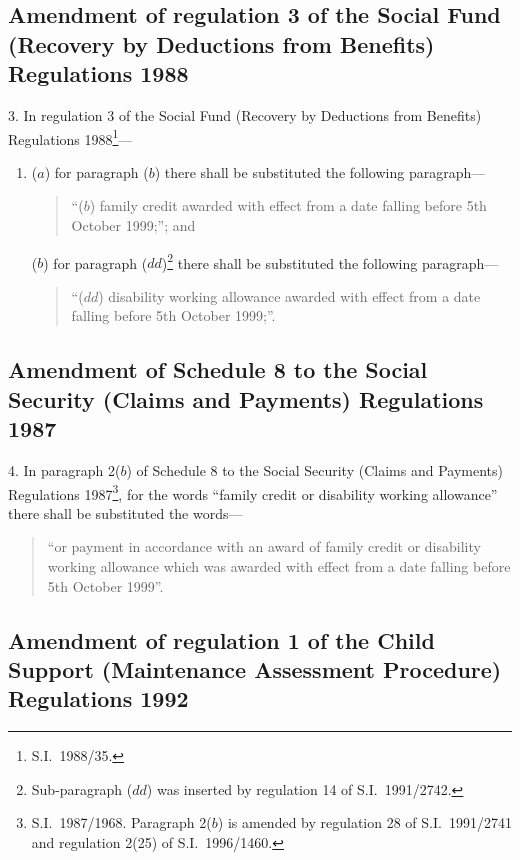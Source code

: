 \documentclass[12pt,a4paper]{article}
\begin{document}
\subsection[3. Amendment of regulation 3 of the Social Fund (Recovery by Deductions from Benefits) Regulations 1988]{Amendment of regulation 3 of the Social Fund (Recovery by Deductions from Benefits) Regulations 1988}

3.  In regulation 3 of the Social Fund (Recovery by Deductions from Benefits) Regulations 1988\footnote{S.I.\ 1988/35.}—
\begin{enumerate}\item[]
($a$) for paragraph ($b$)  there shall be substituted the following paragraph—
\begin{quotation}
“($b$) family credit awarded with effect from a date falling before 5th October 1999;”; and
\end{quotation}

($b$) for paragraph ($dd$)\footnote{Sub-paragraph ($dd$)  was inserted by regulation 14 of S.I.\ 1991/2742.} there shall be substituted the following paragraph—
\begin{quotation}
“($dd$) disability working allowance awarded with effect from a date falling before 5th October 1999;”.
\end{quotation}
\end{enumerate}

\subsection[4. Amendment of Schedule 8 to the Social Security (Claims and Payments) Regulations 1987]{Amendment of Schedule 8 to the Social Security (Claims and Payments) Regulations 1987}

4.  In paragraph 2($b$)  of Schedule 8 to the Social Security (Claims and Payments) Regulations 1987\footnote{S.I.\ 1987/1968. Paragraph 2($b$)  is amended by regulation 28 of S.I.\ 1991/2741 and regulation 2(25) of S.I.\ 1996/1460.}, for the words “family credit or disability working allowance” there shall be substituted the words—
\begin{quotation}
“or payment in accordance with an award of family credit or disability working allowance which was awarded with effect from a date falling before 5th October 1999”.
\end{quotation}

\subsection[5. Amendment of regulation 1 of the Child Support (Maintenance Assessment Procedure) Regulations 1992]{Amendment of regulation 1 of the Child Support (Maintenance Assessment Procedure) Regulations 1992}
\end{document}
